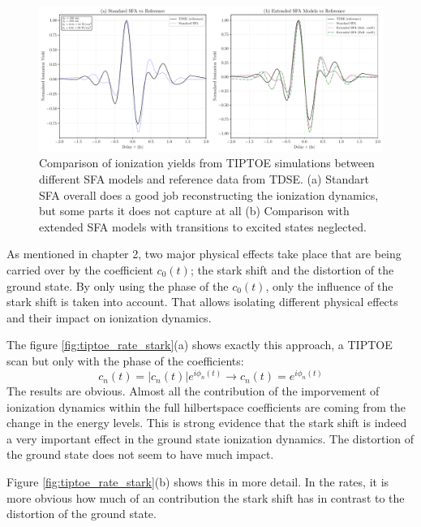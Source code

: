 \begin{figure}
    \centering
    \includegraphics[width=1\textwidth]{../ionModel/python/plotsTIPTOE/2plot_SFA-comparison_1_BA.pdf}
    \caption[Comparison of SFA models and TDSE ionization yields]{Comparison of ionization yields from TIPTOE simulations between different SFA models and reference data from TDSE. 
            (a) Standart SFA overall does a good job reconstructing the ionization dynamics, but some parts it does not capture at all 
            (b) Comparison with extended SFA models with transitions to excited states neglected. }
    \label{fig:tiptoe_sfa_comparison}
\end{figure}


\bigskip
As mentioned in chapter 2, two major physical effects take place that are being carried over by the coefficient $c_0(t)$; the stark shift and the distortion of the ground state. 
By only using the phase of the $c_0(t)$, only the influence of the stark shift is taken into account.
That allows isolating different physical effects and their impact on ionization dynamics.

The figure \ref{fig:tiptoe_rate_stark}(a) shows exactly this approach, a TIPTOE scan but only with the phase of the coefficients:
\begin{equation*}
    c_n(t) = |c_n(t)|e^{i \phi_n(t)} \rightarrow c_n(t) = e^{i \phi_n(t)}
\end{equation*}
The results are obvious.
Almost all the contribution of the imporvement of ionization dynamics within the full hilbertspace coefficients are coming from the change in the energy levels.
This is strong evidence that the stark shift is indeed a very important effect in the ground state ionization dynamics.
The distortion of the ground state does not seem to have much impact.

Figure \ref{fig:tiptoe_rate_stark}(b) shows this in more detail.
In the rates, it is more obvious how much of an contribution the stark shift has in contrast to the distortion of the ground state.





